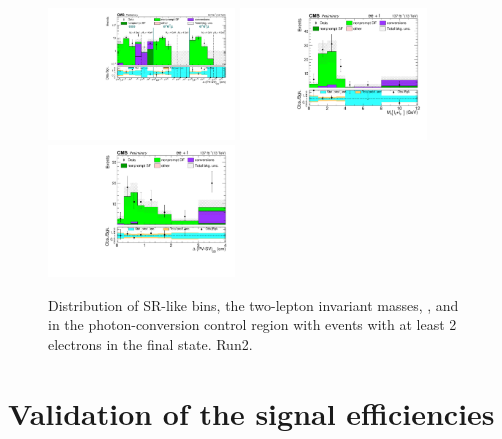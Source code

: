  \begin{figure}[h]
\centering
\includegraphics[height=3.5cm]{Figures/c6/backgrounds/FR/closureTest/Data/conversion/M-6_V-0p00202484567313_e_ele_datacard_combined_SR.pdf}
  \includegraphics[height=3.5cm]{Figures/c6/backgrounds/FR/closureTest/Data/conversion/M-6_V-0p00202484567313_e_ele_mass_datacard_combined_massl2l3.pdf}
  \includegraphics[height=3.5cm]{Figures/c6/backgrounds/FR/closureTest/Data/conversion/M-6_V-0p00202484567313_e_ele_disp_datacard_combined_displacement.pdf}
    \caption{Distribution of SR-like bins, the two-lepton invariant
    masses, \mtwol, and \Deltwod in the photon-conversion control
    region with events with at least 2 electrons in the final state. Run2.}
  \label{fig:phoConv}
\end{figure}

\clearpage
\section{Validation of the signal efficiencies}\label{sec:llcorrection_efficiencies}

